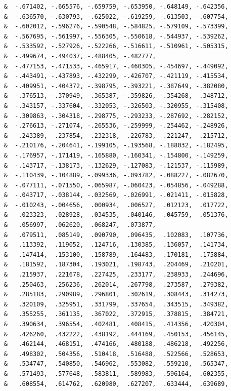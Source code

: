 \begin{lstlisting}
     &  -.671402, -.665576, -.659759, -.653950, -.648149, -.642356,
     &  -.636570, -.630793, -.625022, -.619259, -.613503, -.607754,
     &  -.602012, -.596276, -.590548, -.584825, -.579109, -.573399,
     &  -.567695, -.561997, -.556305, -.550618, -.544937, -.539262,
     &  -.533592, -.527926, -.522266, -.516611, -.510961, -.505315,
     &  -.499674, -.494037, -.488405, -.482777,
     &  -.477153, -.471533, -.465917, -.460305, -.454697, -.449092,
     &  -.443491, -.437893, -.432299, -.426707, -.421119, -.415534,
     &  -.409951, -.404372, -.398795, -.393221, -.387649, -.382080,
     &  -.376513, -.370949, -.365387, -.359826, -.354268, -.348712,
     &  -.343157, -.337604, -.332053, -.326503, -.320955, -.315408,
     &  -.309863, -.304318, -.298775, -.293233, -.287692, -.282152,
     &  -.276613, -.271074, -.265536, -.259999, -.254462, -.248926,
     &  -.243389, -.237854, -.232318, -.226783, -.221247, -.215712,
     &  -.210176, -.204641, -.199105, -.193568, -.188032, -.182495,
     &  -.176957, -.171419, -.165880, -.160341, -.154800, -.149259,
     &  -.143717, -.138173, -.132629, -.127083, -.121537, -.115989,
     &  -.110439, -.104889, -.099336, -.093782, -.088227, -.082670,
     &  -.077111, -.071550, -.065987, -.060423, -.054856, -.049288,
     &  -.043717, -.038144, -.032569, -.026991, -.021411, -.015828,
     &  -.010243, -.004656,  .000934,  .006527,  .012123,  .017722,
     &   .023323,  .028928,  .034535,  .040146,  .045759,  .051376,
     &   .056997,  .062620,  .068247,  .073877,
     &   .079511,  .085149,  .090790,  .096435,  .102083,  .107736,
     &   .113392,  .119052,  .124716,  .130385,  .136057,  .141734,
     &   .147414,  .153100,  .158789,  .164483,  .170181,  .175884,
     &   .181592,  .187304,  .193021,  .198743,  .204469,  .210201,
     &   .215937,  .221678,  .227425,  .233177,  .238933,  .244696,
     &   .250463,  .256236,  .262014,  .267798,  .273587,  .279382,
     &   .285183,  .290989,  .296801,  .302619,  .308443,  .314273,
     &   .320109,  .325951,  .331799,  .337654,  .343515,  .349382,
     &   .355255,  .361135,  .367022,  .372915,  .378815,  .384721,
     &   .390634,  .396554,  .402481,  .408415,  .414356,  .420304,
     &   .426260,  .432222,  .438192,  .444169,  .450153,  .456145,
     &   .462144,  .468151,  .474166,  .480188,  .486218,  .492256,
     &   .498302,  .504356,  .510418,  .516488,  .522566,  .528653,
     &   .534747,  .540850,  .546962,  .553082,  .559210,  .565347,
     &   .571493,  .577648,  .583811,  .589983,  .596164,  .602355,
     &   .608554,  .614762,  .620980,  .627207,  .633444,  .639689,

\end{lstlisting}
